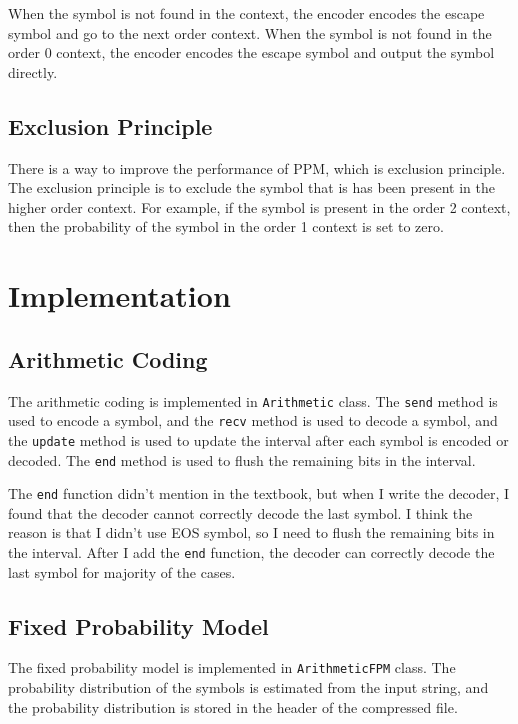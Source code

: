\documentclass[a4paper,conference]{IEEEtran}
\begin{document}
When the symbol is not found in the context, the encoder encodes the escape symbol and go to the next order context. When the symbol is not found in the order 0 context, the encoder encodes the escape symbol and output the symbol directly.

\subsection{Exclusion Principle}

There is a way to improve the performance of PPM, which is exclusion principle. The exclusion principle is to exclude the symbol that is has been present in the higher order context. For example, if the symbol is present in the order 2 context, then the probability of the symbol in the order 1 context is set to zero.

\section{Implementation}

\subsection{Arithmetic Coding}

The arithmetic coding is implemented in \texttt{Arithmetic} class. The \texttt{send} method is used to encode a symbol, and the \texttt{recv} method is used to decode a symbol, and the \texttt{update} method is used to update the interval after each symbol is encoded or decoded. The \texttt{end} method is used to flush the remaining bits in the interval.

The \texttt{end} function didn't mention in the textbook, but when I write the decoder, I found that the decoder cannot correctly decode the last symbol. I think the reason is that I didn't use EOS symbol, so I need to flush the remaining bits in the interval. After I add the \texttt{end} function, the decoder can correctly decode the last symbol for majority of the cases.

\subsection{Fixed Probability Model}

The fixed probability model is implemented in \texttt{ArithmeticFPM} class. The probability distribution of the symbols is estimated from the input string, and the probability distribution is stored in the header of the compressed file.
\end{document}
